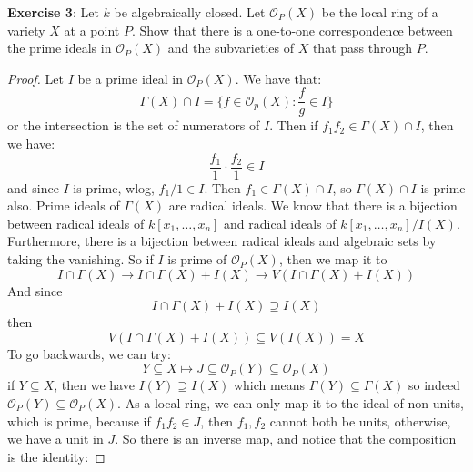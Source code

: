 \documentclass{article}
\begin{document}
\textbf{Exercise 3}: Let $k$ be algebraically closed. Let $\mathcal{O}_{P}(X)$ be the local ring of a variety $X$ at a point $P$. Show that there is a one-to-one correspondence between the prime ideals in $\mathcal{O}_{P}(X)$ and the subvarieties of $X$ that pass through $P$.
    \begin{proof}
        Let $I$ be a prime ideal in $\mathcal{O}_{P}(X)$. We have that:
            \begin{equation*}
                \Gamma(X) \cap I = \{f \in \mathcal{O}_{p}(X) : \dfrac{f}{g} \in I\}
            \end{equation*}
        or the intersection is the set of numerators of $I$. Then if $f_{1}f_{2} \in \Gamma(X) \cap I$, then we have:
            \begin{equation*}
                \dfrac{f_{1}}{1} \cdot \dfrac{f_{2}}{1} \in I
            \end{equation*}
        and since $I$ is prime, wlog, $f_{1}/1 \in I$. Then $f_{1} \in \Gamma(X) \cap I$, so $\Gamma(X) \cap I$ is prime also. Prime ideals of $\Gamma(X)$ are radical ideals. We know that there is a bijection between radical ideals of $k[x_{1}, \ldots , x_{n}]$ and radical ideals of $k[x_{1}, \ldots , x_{n}] / I(X)$. Furthermore, there is a bijection between radical ideals and algebraic sets by taking the vanishing. So if $I$ is prime of $\mathcal{O}_{P}(X)$, then we map it to 
            \begin{equation*}
                I \cap\Gamma(X) \rightarrow I \cap \Gamma(X) + I(X) \rightarrow V(I \cap \Gamma(X) + I(X))
            \end{equation*}
            And since 
            \begin{equation*}
                I \cap\Gamma(X) + I(X) \supseteq I(X)
            \end{equation*}
            then 
            \begin{equation*}
                V(I \cap \Gamma(X) + I(X))  \subseteq V(I(X)) = X
            \end{equation*}
        To go backwards, we can try:
            \begin{equation*}
                Y \subseteq X \mapsto J \subseteq \mathcal{O}_{P}(Y) \subseteq \mathcal{O}_{P}(X)
            \end{equation*}
        if $Y \subseteq X$, then we have $I(Y)  \supseteq I(X)$ which means $\Gamma(Y) \subseteq \Gamma(X)$ so indeed $\mathcal{O}_{P}(Y) \subseteq \mathcal{O}_{P}(X)$. As a local ring, we can only map it to the ideal of non-units, which is prime, because if $f_{1}f_{2} \in J$, then $f_{1}, f_{2}$ cannot both be units, otherwise, we have a unit in $J$. So there is an inverse map, and notice that the composition is the identity:

\end{proof}
\end{document}
